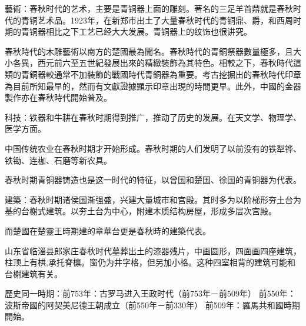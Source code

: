 藝術：春秋时代的艺术，主要是青铜器上面的雕刻。著名的三足羊首鼎就是春秋时代的青铜艺术品。1923年，在新郑市出土了大量春秋时代的青铜鼎、爵，和西周时期的青铜器相比之下工艺已经大大发展。青铜器上的纹饰也很讲究。

春秋時代的木雕藝術以南方的楚國最為聞名。春秋時代的青銅祭器數量極多，且大小各異，西元前六至五世紀發展出來的精緻裝飾為其特色。相較之下，春秋時代這類的青銅器較通常不加裝飾的戰國時代青銅器為重要。考古挖掘出的春秋時代印章為目前所知最早的，然而有文獻證據顯示印章出現的時間更早。此外，中國的金器製作亦在春秋時代開始普及。

科技：铁器和牛耕在春秋时期得到推广，推动了历史的发展。在天文学、物理学、医学方面。

中国传统农业在春秋时期才开始形成。春秋时期的人们发明了以前没有的铁犁铧、铁锄、连枷、石磨等新农具。

春秋时期青铜器铸造也是这一时代的特征，以曾国和楚国、徐国的青铜器为代表。

建築：春秋时期诸侯国渐强盛，兴建大量城市和宫殿。其时多为以阶梯形夯土台为基的台榭式建筑。以夯土台为中心，附建木质结构房屋，形成多层次宫殿。

而楚國在楚靈王時期建的章華台更是春秋時的建築代表。

山东省临淄县郎家庄春秋时代墓葬出土的漆器残片，中画圆形，四面画四座建筑，柱顶上有栱,承托脊檩。窗仍为井字格，但另加小格。这种四室相背的建筑可能和台榭建筑有关。

歷史同一時期：前753年：古罗马进入王政时代（前753年－前509年） 前550年：波斯帝國的阿契美尼德王朝成立（前550年－前330年） 前509年：羅馬共和國時期開始。

% 


